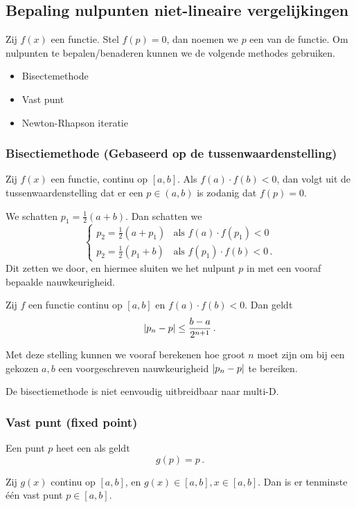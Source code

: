 \documentclass{2wn20summary}
\begin{document}
		\subsection{Bepaling nulpunten niet-lineaire vergelijkingen}
			Zij $f(x)$ een functie. Stel $ f(p) = 0 $, dan noemen we $p$ een  van de functie. Om nulpunten te bepalen/benaderen kunnen we de volgende methodes gebruiken.
			\begin{itemize}
				\item Bisectemethode
				\item Vast punt %
				\item Newton-Rhapson iteratie
			\end{itemize}
			\subsubsection{Bisectiemethode \textmd{(Gebaseerd op de tussenwaardenstelling)}}
				Zij $f(x)$ een functie, continu op $ [a,b] $. Als $ f(a)\cdot f(b) < 0 $, dan volgt uit de tussenwaardenstelling dat er een $p \in (a,b)$ is zodanig dat $ f(p)=0 $. 
				
				We schatten $p_1=\frac{1}{2}(a+b)$. Dan schatten we 
				\[ 
					\begin{cases}
						p_2 = \frac{1}{2}(a+p_1) & \text{als } f(a)\cdot f(p_1)<0 \\
						p_2 = \frac{1}{2}(p_1+b) & \text{als } f(p_1)\cdot f(b)<0\,.
					\end{cases}
				\]
				Dit zetten we door, en hiermee sluiten we het nulpunt $p$ in met een vooraf bepaalde nauwkeurigheid. 
				
				\begin{theorem}
					Zij $f$ een functie continu op $[a,b]$ en $ f(a)\cdot f(b) <0 $. Dan geldt 
					\[ 
						{\left|p_n-p\right|} \le \frac{b-a}{2^{n+1}}\,.
					\]
				\end{theorem}
				Met deze stelling kunnen we vooraf berekenen hoe groot $n$ moet zijn om bij een gekozen $a, b$ een voorgeschreven nauwkeurigheid $ {\left|p_n-p\right|} $ te bereiken.
				
				\begin{opm}
					De bisectiemethode is niet eenvoudig uitbreidbaar naar multi-D.
				\end{opm}

			\subsubsection{Vast punt (fixed point)}
				Een punt $p$ heet een  als geldt
				\[
					g(p)=p\,.
				\]
				\begin{theonum}\label{10-1}
					Zij $g(x)$ continu op $ [a,b] $, en $ g(x) \in [a,b], x \in [a,b] $. Dan is er tenminste \'e\'en vast punt $ p \in [a,b] $.
				\end{theonum}
\end{document}
